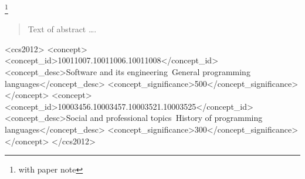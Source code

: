 \documentclass[sigplan,10pt,review,anonymous]{acmart}\settopmatter{printfolios=true}
\begin{document}
\thanks{with paper note}                %


\begin{abstract}
Text of abstract \ldots.
\end{abstract}


\begin{CCSXML}
<ccs2012>
<concept>
<concept_id>10011007.10011006.10011008</concept_id>
<concept_desc>Software and its engineering~General programming languages</concept_desc>
<concept_significance>500</concept_significance>
</concept>
<concept>
<concept_id>10003456.10003457.10003521.10003525</concept_id>
<concept_desc>Social and professional topics~History of programming languages</concept_desc>
<concept_significance>300</concept_significance>
</concept>
</ccs2012>
\end{CCSXML}



\keywords{}  %


\maketitle
\end{document}
